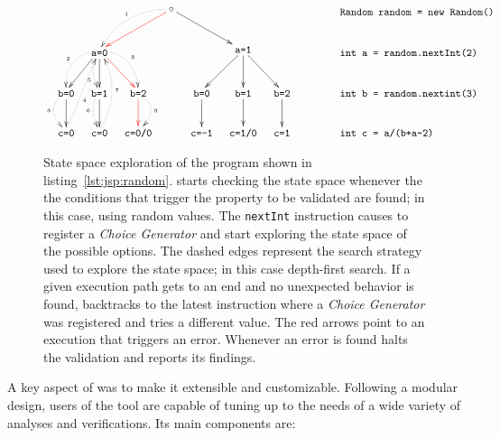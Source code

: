 \begin{figure}[t]
\centering
\[\xymatrix@C=1em{
	& & & \ar@[red][lld] \ar@/_1pc/@{.>}[lld]_{\txt{\tiny 1}} \circ \ar[rrd] & & & & \txt{\texttt{~~~~~~Random random = new Random()}} \\
	& \ar[ld] \ar@/_1pc/@{.>}[ld]_{\txt{\tiny 2}} \ar[d] \ar@/_/@{.>}[d]_(0.7){\txt{\tiny 5}} \txt{\texttt{a=0}} \ar@[red][rd] \ar@/^1pc/@{.>}[rd]^{\txt{\tiny 8}} & & & & 
	  \ar[ld] \ar[d] \texttt{a=1} \ar[rd] & & \txt{\texttt{~~~int a = random.nextInt(2)}} \\
	\ar[d] \ar@/_1pc/@{.>}[d]_{\txt{\tiny 3}} \txt{\texttt{b=0}} & 
	\ar[d] \ar@/_/@{.>}[d]_{\txt{\tiny 6}} \txt{\texttt{b=1}} & 
	\ar@[red][d] \ar@/^1pc/@{.>}[d]^{\txt{\tiny 9}} \txt{\texttt{b=2}} & & 
	\ar[d] \txt{\texttt{b=0}} & 
	\ar[d] \txt{\texttt{b=1}} & 
	\ar[d] \txt{\texttt{b=2}} & \txt{\texttt{~~~int b = random.nextint(3)}} \\
	\txt{\texttt{c=0}} \ar@{.>}[ruu]_(0.4){\txt{\tiny 4}} & 
	\ar@/_1pc/@{.>}[uu]_{\txt{\tiny 7}} \txt{\texttt{c=0}} & 
	\txt{\texttt{c=0/0}} & & 
	\txt{\texttt{c=-1}} & 
	\txt{\texttt{c=1/0}} & 
	\txt{\texttt{c=1}} & 
	\txt{\texttt{int c = a/(b+a-2)~~~~~~}}
} \]
\caption[State space exploration of an example program]{State space exploration of the program shown in listing~\ref{lst:jsp:random}. \jpf{} starts checking the state space whenever the the conditions that trigger the property to be validated are found; in this case, using random values. The \texttt{nextInt} instruction causes \jpf{} to register a \textit{Choice Generator} and start exploring the state space of the possible options. The dashed edges represent the search strategy used to explore the state space; in this case depth-first search. If a given execution path gets to an end and no unexpected behavior is found, \jpf{} backtracks to the latest instruction where a \textit{Choice Generator} was registered and tries a different value. The red arrows point to an execution that triggers an error. Whenever an error is found \jpf{} halts the validation and reports its findings.}
\label{fig:jpf:random}
\end{figure}

A key aspect of \jpf{} was to make it extensible and customizable. Following a modular design, users of the tool are capable of tuning \jpf{} up to the needs of a wide variety of analyses and verifications. Its main components are:

